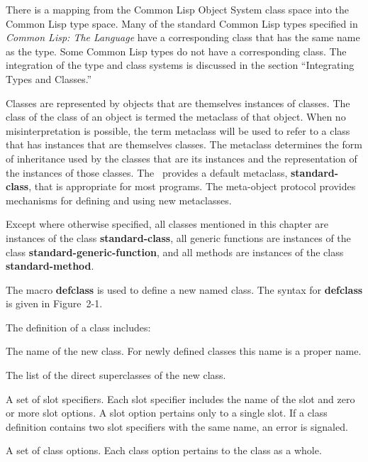 There is a mapping from the Common Lisp Object System class space into
the Common Lisp type space.  Many of the standard Common Lisp types
specified in {\it Common Lisp: The Language\/} have a corresponding
class that has the same name as the type.  Some Common Lisp types do
not have a corresponding class.  The integration of the type and class
systems is discussed in the section ``Integrating Types and Classes.''

Classes are represented by objects that are themselves
instances of classes.  The class of the class of an object is termed
the {\bit metaclass\/} of that object.  When no misinterpretation is
possible, the term {\bit metaclass\/} will be used to refer to a class
that has instances that are themselves classes.  The metaclass
determines the form of inheritance used by the classes that are its
instances and the representation of the instances of those classes.
The \CLOS\ provides a default metaclass, {\bf standard-class}, that is
appropriate for most programs.  The meta-object protocol provides
mechanisms for defining and using new metaclasses.

Except where otherwise specified, all classes mentioned in this
chapter are instances of the class {\bf standard-class}, all generic
functions are instances of the class {\bf standard-generic-function},
and all methods are instances of the class {\bf standard-method}.


The macro {\bf defclass} is used to define a new named class.  The
syntax for {\bf defclass} is given in Figure~2-1.

The definition of a class includes:

\beginlist

\item{\bull} The name of the new class. For newly defined classes
this name is a proper name.

\item{\bull} The list of the direct superclasses of the new class. 

\item{\bull} A set of {\bit slot specifiers}.  Each slot specifier
includes the name of the slot and zero or more {\bit slot options}.  A
slot option pertains only to a single slot. If a class definition
contains two slot specifiers with the same name, an error is signaled.

\item{\bull} A set of {\bit class options}.  Each class option pertains 
to the class as a whole.  
\endlist


